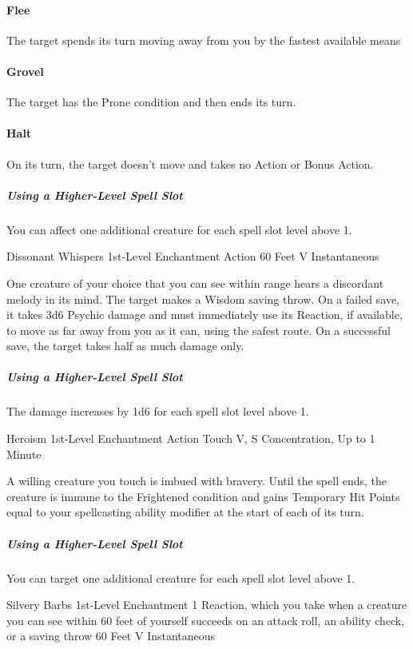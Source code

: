 \documentclass[letterpaper,openany,oneside,twocolumn]{book}
\begin{document}
\paragraph*{Flee} The target spends its turn moving away from you by the fastest available means

\paragraph*{Grovel} The target has the Prone condition and then ends its turn.

\paragraph*{Halt} On its turn, the target doesn't move and takes no Action or Bonus Action.

\subparagraph*{Using a Higher-Level Spell Slot} You can affect one additional creature for each spell slot level above 1.

\DndSpellHeader
  {Dissonant Whispers}
  {1st-Level Enchantment}
  {Action}
  {60 Feet}
  {V}
  {Instantaneous}

One creature of your choice that you can see within range hears a discordant melody in its mind. The target makes a Wisdom saving throw. On a failed save, it takes 3d6 Psychic damage and must immediately use its Reaction, if available, to move as far away from you as it can, using the safest route. On a successful save, the target takes half as much damage only.

\subparagraph*{Using a Higher-Level Spell Slot} The damage increases by 1d6 for each spell slot level above 1.

\DndSpellHeader
  {Heroism}
  {1st-Level Enchantment}
  {Action}
  {Touch}
  {V, S}
  {Concentration, Up to 1 Minute}

A willing creature you touch is imbued with bravery. Until the spell ends, the creature is immune to the Frightened condition and gains Temporary Hit Points equal to your spellcasting ability modifier at the start of each of its turn.

\subparagraph*{Using a Higher-Level Spell Slot} You can target one additional creature for each spell slot level above 1.

\DndSpellHeader
  {Silvery Barbs}
  {1st-Level Enchantment}
  {1 Reaction, which you take when a creature you can see within 60 feet of yourself succeeds on an attack roll, an ability check, or a saving throw}
  {60 Feet}
  {V}
  {Instantaneous}
\end{document}
